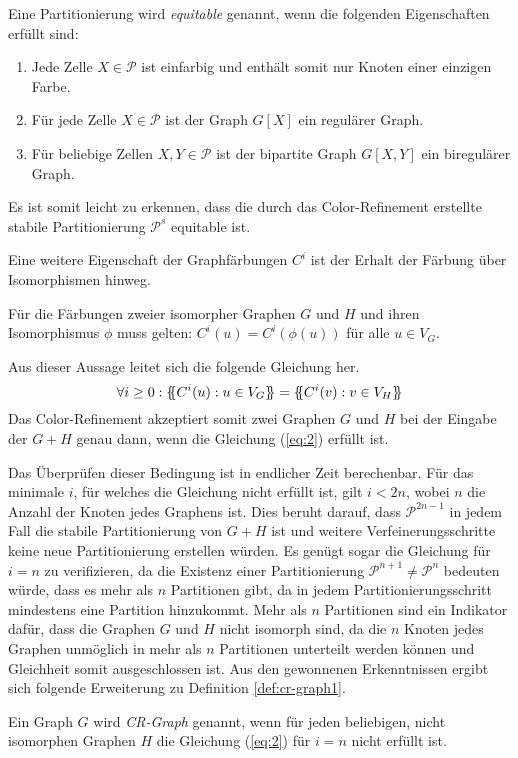 \begin{Definition}
	Eine Partitionierung wird \emph{equitable} genannt, wenn die folgenden Eigenschaften erfüllt sind:
	\begin{enumerate}[label=(\alph*)]
		\item Jede Zelle $X\in \mathcal{P}$ ist einfarbig und enthält somit nur Knoten einer einzigen Farbe.
		\item Für jede Zelle $X\in \mathcal{P}$ ist der Graph $G[X]$ ein regulärer Graph.
		\item Für beliebige Zellen $X,Y\in \mathcal{P}$ ist der bipartite Graph $G[X,Y]$ ein biregulärer Graph.
	\end{enumerate}
\end{Definition}
Es ist somit leicht zu erkennen, dass die durch das Color-Refinement erstellte stabile Partitionierung $\mathcal{P}^s$ equitable ist.

Eine weitere Eigenschaft der Graphfärbungen $C^i$ ist der Erhalt der Färbung über Isomorphismen hinweg.
\begin{Lemma}
	Für die Färbungen zweier isomorpher Graphen $G$ und $H$ und ihren Isomorphismus $\phi$ muss gelten: $C^i(u)=C^i(\phi (u))$ für alle $u\in V_G$.
	\label{lemma:faerbung_isomorphismus}
\end{Lemma}
Aus dieser Aussage leitet sich die folgende Gleichung her.
\begin{equation}
\forall i\geq 0:\{\mskip-5mu\{ C^i(u):u\in V_G\}\mskip-5mu\} =\{\mskip-5mu\{ C^i(v):v\in V_H\}\mskip-5mu\} 
\label{eq:2}
\end{equation}
Das Color-Refinement akzeptiert somit zwei Graphen $G$ und $H$ bei der Eingabe der  $G+H$ genau dann, wenn die Gleichung (\ref{eq:2}) erfüllt ist.

Das Überprüfen dieser Bedingung ist in endlicher Zeit berechenbar.
Für das minimale $i$, für welches die Gleichung nicht erfüllt ist, gilt $i<2n$, wobei $n$ die Anzahl der Knoten jedes Graphens ist.
Dies beruht darauf, dass $\mathcal{P}^{2n-1}$ in jedem Fall die stabile Partitionierung von $G+H$ ist und weitere Verfeinerungsschritte keine neue Partitionierung erstellen würden.
Es genügt sogar die Gleichung für $i=n$ zu verifizieren, da die Existenz einer Partitionierung $\mathcal{P}^{n+1}\neq \mathcal{P}^n$ bedeuten würde, dass es mehr als $n$ Partitionen gibt, da in jedem Partitionierungsschritt mindestens eine Partition hinzukommt.
Mehr als $n$ Partitionen sind ein Indikator dafür, dass die Graphen $G$ und $H$ nicht isomorph sind, da die $n$ Knoten jedes Graphen unmöglich in mehr als $n$ Partitionen unterteilt werden können und Gleichheit somit ausgeschlossen ist.
Aus den gewonnenen Erkenntnissen ergibt sich folgende Erweiterung zu Definition \ref{def:cr-graph1}.
\begin{Definition}
	Ein Graph $G$ wird \emph{CR-Graph} genannt, wenn für jeden beliebigen, nicht isomorphen Graphen $H$ die Gleichung (\ref{eq:2}) für $i=n$ nicht erfüllt ist.
	\label{def:cr-graph2}
\end{Definition}
